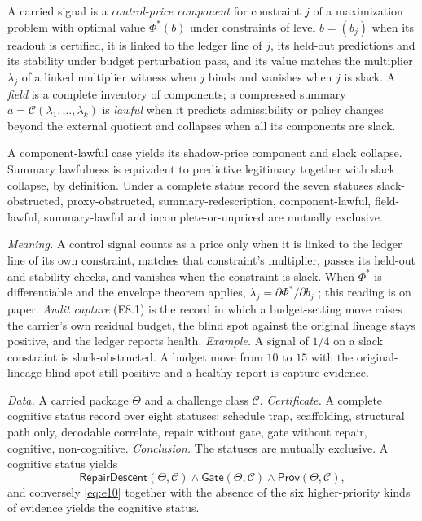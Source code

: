 \begin{definition}\label{def:e8}
A carried signal is a \emph{control-price component} for constraint $j$ of a maximization problem
with optimal value $\Phi^*(b)$ under constraints of level $b = (b_j)$ when its readout is certified, it is linked to the ledger line of $j$, its held-out
predictions and its stability under budget perturbation pass, and its value matches the multiplier
$\lambda_j$ of a linked multiplier witness when $j$ binds and vanishes when $j$ is slack. A
\emph{field} is a complete inventory of components; a compressed summary
$a = \mathcal C(\lambda_1, \ldots, \lambda_k)$ is \emph{lawful} when it predicts admissibility or
policy changes beyond the external quotient and collapses when all its components are slack.
\end{definition}

\begin{lemma}\label{lem:e8}
A component-lawful case yields its shadow-price component and slack collapse. Summary lawfulness is
equivalent to predictive legitimacy together with slack collapse, by definition. Under a complete
status record the seven statuses slack-obstructed, proxy-obstructed, summary-redescription,
component-lawful, field-lawful, summary-lawful and incomplete-or-unpriced are mutually exclusive.
\end{lemma}

\emph{Meaning.} A control signal counts as a price only when it is linked to the ledger line of its
own constraint, matches that constraint's multiplier, passes its held-out and stability checks, and
vanishes when the constraint is slack. When $\Phi^*$ is differentiable and the envelope theorem
applies, $\lambda_j = \partial\Phi^*/\partial b_j$
\citep[\S 5.6.3]{BoydVandenberghe2004}; this reading is on paper. \emph{Audit capture} (E8.1) is the
record in which a budget-setting move raises the carrier's own residual budget, the blind spot
against the original lineage stays positive, and the ledger reports health.
\emph{Example.} A signal of $1/4$ on a slack constraint is slack-obstructed. A budget move from $10$
to $15$ with the original-lineage blind spot still positive and a healthy report is capture evidence.

\begin{schema}\label{tmpl:e10}
\emph{Data.} A carried package $\Theta$ and a challenge class $\mathcal C$.
\emph{Certificate.} A complete cognitive status record over eight statuses: schedule trap,
scaffolding, structural path only, decodable correlate, repair without gate, gate without repair,
cognitive, non-cognitive.
\emph{Conclusion.} The statuses are mutually exclusive. A cognitive status yields
\begin{equation}\label{eq:e10}
  \mathsf{RepairDescent}(\Theta, \mathcal C) \wedge \mathsf{Gate}(\Theta, \mathcal C) \wedge
  \mathsf{Prov}(\Theta, \mathcal C),
\end{equation}
and conversely \eqref{eq:e10} together with the absence of the six higher-priority kinds of
evidence yields the cognitive status.
\end{schema}

